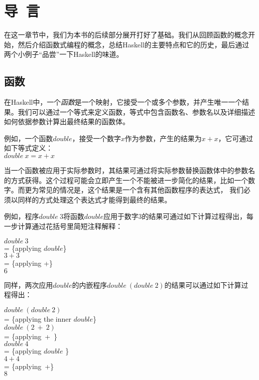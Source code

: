\chapter{导~言}
在这一章节中，我们为本书的后续部分展开打好了基础。我们从回顾函数的概念开始，然后介绍函数式编程的概念，总结Haskell的主要特点和它的历史，最后通过两个小例子“品尝”一下Haskell的味道。

\section{函数}
在Haskell中，一个\textit{函数}是一个映射，它接受一个或多个参数，并产生唯一一个结果。我们可以通过一个等式来定义函数，等式中包含函数名、参数名以及详细描述如何依据参数计算出最终结果的函数体。

例如，一个函数$double$，接受一个数字$x$作为参数，产生的结果为$x + x$，它可通过如下等式定义：\\
\hspace*{1cm} $double~x = x + x$

当一个函数被应用于实际参数时，其结果可通过将实际参数替换函数体中的参数名的方式获得。这个过程可能会立即产生一个不能被进一步简化的结果，比如一个数字。而更为常见的情况是，这个结果是一个含有其他函数程序的表达式， 我们必须以同样的方式处理这个表达式才能得到最终的结果。 

例如，程序$double~3$将函数$double$应用于数字3的结果可通过如下计算过程得出，每一步计算通过花括号里简短注释解释：

\noindent\hspace*{1cm} $double~3$ \\ 
\hspace*{1cm} = \{applying $double$\} \\
\hspace*{1cm} $3 + 3$\\
\hspace*{1cm} = \{applying +\}\\
\hspace*{1cm} $6$

同样，两次应用$double$的内嵌程序$double~(double~2)$的结果可以通过如下计算过程得出：

\noindent\hspace*{1cm} $double~(double~2)$\\
\hspace*{1cm} = \{applying the inner $double$\}\\
\hspace*{1cm} $double~(2~+~2)$\\
\hspace*{1cm} = \{applying~+~\}\\
\hspace*{1cm} $double~4$\\
\hspace*{1cm} = \{applying $double$ \}\\
\hspace*{1cm} $4+4$\\
\hspace*{1cm} = \{applying~+\}\\
\hspace*{1cm} $8$

